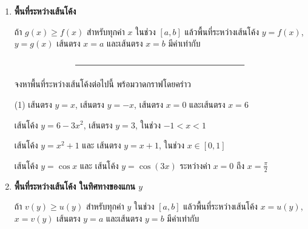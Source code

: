 \begin{enumerate}


\item \textbf{พื้นที่ระหว่างเส้นโค้ง}

ถ้า $g(x) \geq f(x)$ สำหรับทุกค่า $x$ ในช่วง $[a,b]$ แล้วพื้นที่ระหว่างเส้นโค้ง $y=f(x)$, $y=g(x)$ เส้นตรง $x =a$ และเส้นตรง $x=b$ มีค่าเท่ากับ

\[ \rule{200pt}{1pt} \]

จงหาพื้นที่ระหว่างเส้นโค้งต่อไปนี้ พร้อมวาดกราฟโดยคร่าว

\begin{tasks}[after-skip=0pt, after-item-skip = 20pt](1)
\task เส้นตรง $y = x$, เส้นตรง $y = -x$, เส้นตรง $x=0$ และเส้นตรง $x = 6$

\hfill
{}

\task เส้นโค้ง $y=6-3x^2$, เส้นตรง $y=3$, ในช่วง $-1 < x < 1$

\hfill
{}

\task เส้นโค้ง $y=x^2+1$ และ เส้นตรง $y=x+1$, ในช่วง $x \in [0,1]$

\hfill
{}

\task เส้นโค้ง $y = \cos x$ และ เส้นโค้ง $y = \cos (3x)$ ระหว่างค่า $x = 0$ ถึง $x = \frac{\pi}{2}$

\hfill
{}

\end{tasks}

\newpage
\item \textbf{พื้นที่ระหว่างเส้นโค้ง ในทิศทางของแกน $y$}

ถ้า $v(y) \geq u(y)$ สำหรับทุกค่า $y$ ในช่วง $[a,b]$ แล้วพื้นที่ระหว่างเส้นโค้ง $x=u(y)$, $x=v(y)$ เส้นตรง $y =a$ และเส้นตรง $y=b$ มีค่าเท่ากับ


\end{enumerate}
